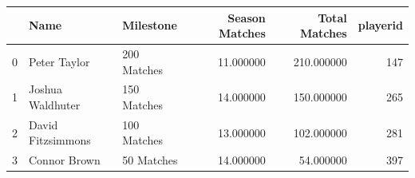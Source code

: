 \begin{tabular}{lllrrr}
\toprule
 & Name & Milestone & Season Matches & Total Matches & playerid \\
\midrule
0 & Peter Taylor & 200 Matches & 11.000000 & 210.000000 & 147 \\
1 & Joshua Waldhuter & 150 Matches & 14.000000 & 150.000000 & 265 \\
2 & David Fitzsimmons & 100 Matches & 13.000000 & 102.000000 & 281 \\
3 & Connor Brown & 50 Matches & 14.000000 & 54.000000 & 397 \\
\bottomrule
\end{tabular}

